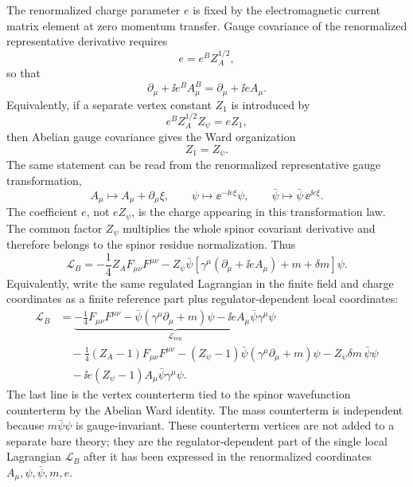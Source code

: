 \begin{definition}
The renormalized charge parameter \(e\) is fixed by the electromagnetic
current matrix element at zero momentum transfer. Gauge covariance of the
renormalized representative derivative requires
\[
  e=e^B Z_A^{1/2},
\]
so that
\[
  \partial_\mu+\ii e^B A_\mu^B
  =
  \partial_\mu+\ii e A_\mu .
\]
Equivalently, if a separate vertex constant \(Z_1\) is introduced by
\[
  e^B Z_A^{1/2}Z_\psi=eZ_1,
\]
then Abelian gauge covariance gives the Ward organization
\[
  Z_1=Z_\psi .
\]
The same statement can be read from the renormalized representative gauge
transformation,
\[
  A_\mu\mapsto A_\mu+\partial_\mu\xi,\qquad
  \psi\mapsto \ee^{-\ii e\xi}\psi,\qquad
  \bar\psi\mapsto \bar\psi\,\ee^{\ii e\xi}.
\]
The coefficient \(e\), not \(eZ_\psi\), is the charge appearing in this
transformation law.  The common factor \(Z_\psi\) multiplies the whole spinor
covariant derivative and therefore belongs to the spinor residue
normalization.
Thus
\[
  \mathcal L_B
  =
  -\frac14Z_A F_{\mu\nu}F^{\mu\nu}
  -
  Z_\psi\bar\psi
  \left[
    \gamma^\mu(\partial_\mu+\ii e A_\mu)+m+\delta m
  \right]\psi .
\]
Equivalently, write the same regulated Lagrangian in the finite field and
charge coordinates as a finite reference part plus regulator-dependent local
coordinates:
\[
\begin{aligned}
  \mathcal L_B
  &=
  \underbrace{
    -\frac14F_{\mu\nu}F^{\mu\nu}
    -\bar\psi(\gamma^\mu\partial_\mu+m)\psi
    -\ii eA_\mu\bar\psi\gamma^\mu\psi
  }_{\mathcal L_{\mathrm{ren}}}
\\
  &\quad
  -\frac14(Z_A-1)F_{\mu\nu}F^{\mu\nu}
  -(Z_\psi-1)\bar\psi(\gamma^\mu\partial_\mu+m)\psi
  -Z_\psi\delta m\,\bar\psi\psi
\\
  &\quad
  -\ii e(Z_\psi-1)A_\mu\bar\psi\gamma^\mu\psi .
\end{aligned}
\]
The last line is the vertex counterterm tied to the spinor wavefunction
counterterm by the Abelian Ward identity. The mass counterterm is independent
because \(m\bar\psi\psi\) is gauge-invariant.  These counterterm vertices are
not added to a separate bare theory; they are the regulator-dependent part of
the single local Lagrangian \(\mathcal L_B\) after it has been expressed in
the renormalized coordinates \(A_\mu,\psi,\bar\psi,m,e\).
\end{definition}

